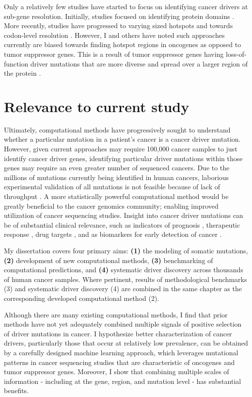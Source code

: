 Only a relatively few studies have started to focus on identifying cancer drivers at sub-gene resolution. Initially, studies focused on identifying protein domains \cite{RN46, RN110}. More recently, studies have progressed to varying sized hotspots and towards codon-level resolution \cite{RN166, RN16, RN55}. However, I and others have noted such approaches currently are biased towards finding hotspot regions in oncogenes as opposed to tumor suppressor genes. This is a result of tumor suppressor genes having loss-of-function driver mutations that are more diverse and spread over a larger region of the protein \cite{RN60}. 

\section{Relevance to current study}
\label{sec:section}

Ultimately, computational methods have progressively sought to understand whether a particular mutation in a patient's cancer is a cancer driver mutation. However, given current approaches may require 100,000 cancer samples to just identify cancer driver genes, identifying particular driver mutations within those genes may require an even greater number of sequenced cancers. Due to the millions of mutations currently being identified in human cancers, laborious experimental validation of all mutations is not feasible because of lack of throughput \cite{RN57, RN61}. A more statistically powerful computational method would be greatly beneficial to the cancer genomics community; enabling improved utilization of cancer sequencing studies. Insight into cancer driver mutations can be of substantial clinical relevance, such as indicators of prognosis \cite{RN6, RN159}, therapeutic response \cite{RN58}, drug targets \cite{RN104}, and as biomarkers for early detection of cancer \cite{RN59}. 

My dissertation covers four primary aims: \textbf{(1)} the modeling of somatic mutations, \textbf{(2)} development of new computational methods, \textbf{(3)} benchmarking of computational predictions, and \textbf{(4)} systematic driver discovery across thousands of human cancer samples. Where pertinent, results of methodological benchmarks (3) and systematic driver discovery (4) are combined in the same chapter as the corresponding developed computational method (2).

Although there are many existing computational methods, I find that prior methods have not yet adequately combined multiple signals of positive selection of driver mutations in cancer. I hypothesize better characterization of cancer drivers, particularly those that occur at relatively low prevalence, can be obtained by a carefully designed machine learning approach, which leverages mutational patterns in cancer sequencing studies that are characteristic of oncogenes and tumor suppressor genes. Moreover, I show that combining multiple scales of information - including at the gene, region, and mutation level - has substantial benefits.

